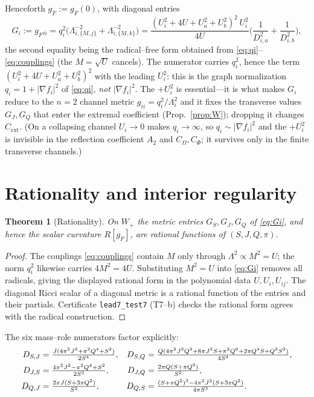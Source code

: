 \documentclass[11pt]{article}
\newtheorem{theorem}{Theorem}
\newcommand{\Wp}{W_{+}}
\newcommand{\Rext}{C_{\mathrm{ext}}}
\begin{document}
Henceforth $g_F:=g_F(0)$, with diagonal entries
\begin{equation}
G_i:=g_F{}_{ii}=q_i^2\Big(\Lambda_{i,\{M,j\}}^{-2}+\Lambda_{i,\{M,k\}}^{-2}\Big)
=\frac{(U_i^2+4U+U_a^2+U_b^2)^2\,U_i^2}{4U}\Big(\frac1{D_{i,a}^2}+\frac1{D_{i,b}^2}\Big),
\label{eq:Gi}
\end{equation}
the second equality being the radical--free form obtained from \eqref{eq:qi}--\eqref{eq:couplings}
(the $M=\sqrt U$ cancels). The numerator carries $q_i^2$, hence the term
$(U_i^2+4U+U_a^2+U_b^2)^2$ with the leading $U_i^2$: this is the graph normalization $q_i=1+|\nabla
f_i|^2$ of \eqref{eq:qi}, \emph{not} $|\nabla f_i|^2$. The $+U_i^2$ is essential---it is what makes
$G_i$ reduce to the $n=2$ channel metric $g_{ii}=q_i^2/\Lambda_i^2$ and it fixes the transverse
values $G_J,G_Q$ that enter the extremal coefficient (Prop.~\ref{prop:W}); dropping it changes
$\Rext$. (On a collapsing channel $U_i\to0$ makes $q_i\to\infty$, so $q_i\sim|\nabla f_i|^2$ and the
$+U_i^2$ is invisible in the reflection coefficient $A_2$ and $C_\Omega,C_\Phi$; it survives only in
the finite transverse channels.)

\section{Rationality and interior regularity}
\label{sec:clean}

\begin{theorem}[Rationality]
\label{thm:rational}
On $\Wp$ the metric entries $G_S,G_J,G_Q$ of \eqref{eq:Gi}, and hence the scalar curvature
$R[g_F]$, are rational functions of $(S,J,Q,\pi)$.
\end{theorem}

\begin{proof}
The couplings \eqref{eq:couplings} contain $M$ only through $\Lambda^2\propto M^2=U$; the norm
$q_i^2$ likewise carries $4M^2=4U$. Substituting $M^2=U$ into \eqref{eq:Gi} removes all
radicals, giving the displayed rational form in the polynomial data $U,U_i,U_{ij}$. The
diagonal Ricci scalar of a diagonal metric is a rational function of the entries and their
partials. Certificate \texttt{lead7\_test7} (T7--b) checks the rational form agrees with the
radical construction. \qedhere
\end{proof}

The six mass--role numerators factor explicitly:
\begin{align}
D_{S,J}&=\tfrac{J(4\pi^2J^2+\pi^2Q^4+S^2)}{2S^4}, &
D_{S,Q}&=\tfrac{Q(4\pi^2J^2Q^2+8\pi J^2S+\pi^2Q^6+2\pi Q^4S+Q^2S^2)}{4S^4},\notag\\
D_{J,S}&=\tfrac{4\pi^2J^2-\pi^2Q^4+S^2}{2S^3}, &
D_{J,Q}&=\tfrac{2\pi Q(S+\pi Q^2)}{S^2},\label{eq:Dfactors}\\
D_{Q,J}&=\tfrac{2\pi J(S+3\pi Q^2)}{S^2}, &
D_{Q,S}&=\tfrac{(S+\pi Q^2)^3-4\pi^2J^2(S+3\pi Q^2)}{4\pi S^3}.\notag
\end{align}
\end{document}
